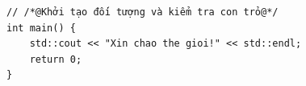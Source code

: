 \documentclass[12pt,a4paper]{article}
\begin{document}
\begin{lstlisting}
// /*@Khởi tạo đối tượng và kiểm tra con trỏ@*/
int main() {
    std::cout << "Xin chao the gioi!" << std::endl;
    return 0;
}
\end{lstlisting}
\end{document}

